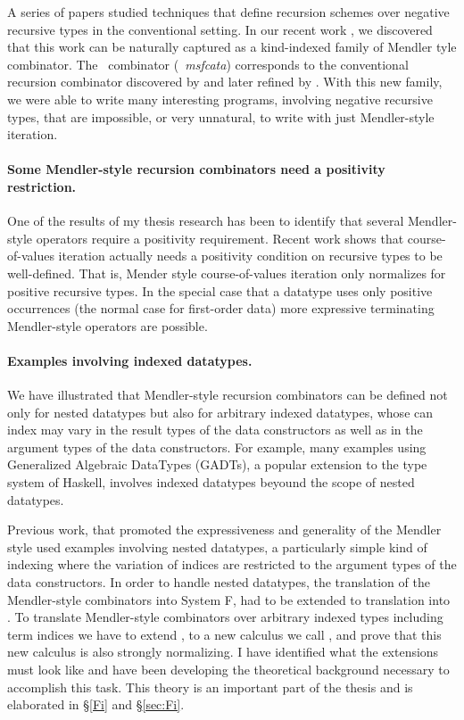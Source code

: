 A series of papers \cite{Pat93,MeiHut95,FegShe96,DesPfeSch97,bgb} studied 
techniques that define recursion schemes over negative recursive types in
the conventional setting. In our recent work \cite{AhnShe11}, we discovered
that this work can be naturally captured as a kind-indexed family of Mendler
tyle combinator. The \MsfIt\ combinator (\aka\ \textit{msfcata}) corresponds to
the conventional recursion combinator discovered by \citet{FegShe96} and
later refined by \citet{bgb}. With this new family, we were able to write many
interesting programs, involving negative recursive types, that are impossible,
or very unnatural, to write with just Mendler-style iteration.

\paragraph{Some Mendler-style recursion combinators need
           a positivity restriction.}
One of the results of my thesis research has been to identify that several
Mendler-style operators require a positivity requirement. 
Recent work \cite{AhnShe11} shows that course-of-values iteration
\cite{vene00phd,UusVen02} actually needs a positivity condition on
recursive types to be well-defined. That is, Mender style course-of-values
iteration only normalizes for positive recursive types. In the special case
that a datatype uses only positive occurrences (the normal case for first-order
data) more expressive terminating Mendler-style operators are possible.

\paragraph{Examples involving indexed datatypes.} 
We \cite{AhnShe11} have illustrated that Mendler-style recursion combinators
can be defined not only for nested datatypes but also for arbitrary indexed
datatypes, whose can index may vary in the result types of the
data constructors as well as in the argument types of the data constructors.
For example, many examples using Generalized Algebraic DataTypes (GADTs),
a popular extension to the type system of Haskell, involves indexed datatypes
beyound the scope of nested datatypes.

Previous work, that promoted the expressiveness and generality of
the Mendler style \cite{AbeMatUus03,AbeMatUus05,AbeMat04} used examples
involving nested datatypes, a particularly simple kind of indexing
where the variation of indices are restricted to the argument types of
the data constructors. In order to handle nested datatypes, the translation of
the Mendler-style combinators into System \textsf{F}, had to be extended to
translation into \Fw. To translate Mendler-style combinators over arbitrary
indexed types including term indices we have to extend \Fw, to a new calculus
we call \Fi, and prove that this new calculus is also strongly normalizing.
I have identified what the extensions must look like and have been developing
the theoretical background necessary to accomplish this task.
This theory is an important part of the thesis and is elaborated in
\S\ref{Fi} and \S\ref{sec:Fi}.

